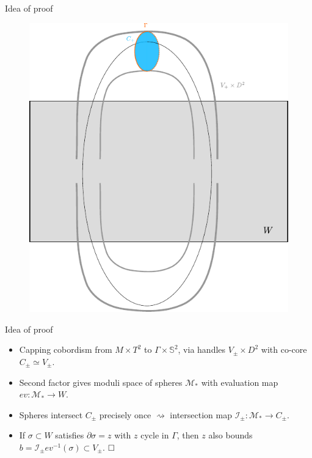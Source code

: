 \documentclass{beamer}
\begin{document}
\begin{frame}{Idea of proof}
    \begin{figure}
        \centering
        \includegraphics[width=.6\linewidth]{../images/obstruction_proof_sketch_no_homology.pdf}
    \end{figure}
\end{frame}

\begin{frame}{Idea of proof}
    \begin{itemize}
    \item Capping cobordism from $M\times T^2$ to $\Gamma\times \mathbb S^2$, via handles $V_\pm \times D^2$ with co-core $C_\pm \simeq V_\pm$. 
    \item Second factor gives moduli space of spheres $\mathcal M_*$ with evaluation map $ev: \mathcal M_*\rightarrow W$. 
    \item Spheres intersect $C_\pm$ precisely once $\rightsquigarrow$ intersection map $\mathcal I_\pm:\mathcal M_*\rightarrow C_\pm$.
    
    \pause 

    \item If $\sigma \subset W$ satisfies $\partial \sigma=z$ with $z$ cycle in $\Gamma$, 
    then $z$ also bounds $b=\mathcal I_\pm ev^{-1}(\sigma) \subset V_\pm$. $\hfill\square$ 
    
    \end{itemize}
\end{frame}
\end{document}
